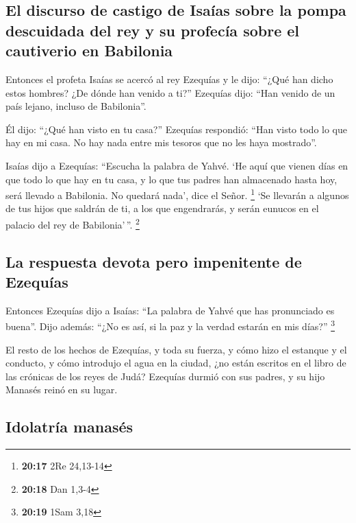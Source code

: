 \hypertarget{el-discurso-de-castigo-de-isauxedas-sobre-la-pompa-descuidada-del-rey-y-su-profecuxeda-sobre-el-cautiverio-en-babilonia}{%
\subsection{El discurso de castigo de Isaías sobre la pompa descuidada
del rey y su profecía sobre el cautiverio en
Babilonia}\label{el-discurso-de-castigo-de-isauxedas-sobre-la-pompa-descuidada-del-rey-y-su-profecuxeda-sobre-el-cautiverio-en-babilonia}}

 Entonces el profeta Isaías se acercó al rey Ezequías y
le dijo: ``¿Qué han dicho estos hombres? ¿De dónde han venido a ti?''
Ezequías dijo: ``Han venido de un país lejano, incluso de Babilonia''.

 Él dijo: ``¿Qué han visto en tu casa?'' Ezequías
respondió: ``Han visto todo lo que hay en mi casa. No hay nada entre mis
tesoros que no les haya mostrado''.

 Isaías dijo a Ezequías: ``Escucha la palabra de Yahvé.
 `He aquí que vienen días en que todo lo que hay en tu
casa, y lo que tus padres han almacenado hasta hoy, será llevado a
Babilonia. No quedará nada', dice el Señor. \footnote{\textbf{20:17} 2Re
  24,13-14}  `Se llevarán a algunos de tus hijos que
saldrán de ti, a los que engendrarás, y serán eunucos en el palacio del
rey de Babilonia'\,''. \footnote{\textbf{20:18} Dan 1,3-4}

\hypertarget{la-respuesta-devota-pero-impenitente-de-ezequuxedas}{%
\subsection{La respuesta devota pero impenitente de
Ezequías}\label{la-respuesta-devota-pero-impenitente-de-ezequuxedas}}

 Entonces Ezequías dijo a Isaías: ``La palabra de Yahvé
que has pronunciado es buena''. Dijo además: ``¿No es así, si la paz y
la verdad estarán en mis días?'' \footnote{\textbf{20:19} 1Sam 3,18}

 El resto de los hechos de Ezequías, y toda su fuerza, y
cómo hizo el estanque y el conducto, y cómo introdujo el agua en la
ciudad, ¿no están escritos en el libro de las crónicas de los reyes de
Judá?  Ezequías durmió con sus padres, y su hijo Manasés
reinó en su lugar.

\hypertarget{idolatruxeda-manasuxe9s}{%
\subsection{Idolatría manasés}\label{idolatruxeda-manasuxe9s}}

